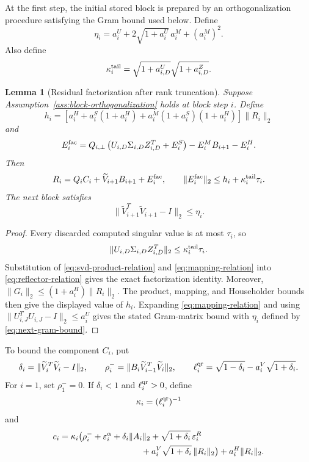 \documentclass[11pt]{article}
\newtheorem{lemma}{Lemma}
\theoremstyle{definition}
\newcommand{\eps}{\varepsilon}
\begin{document}
At the first step, the initial stored block is prepared by an
orthogonalization procedure satisfying the Gram bound used below.
Define
\begin{equation}
 \eta_i=a_i^U+2\sqrt{1+a_i^U}\,a_i^M+(a_i^M)^2.
 \label{eq:next-gram-bound}
\end{equation}
Also define
\begin{equation}
 \kappa_i^{\rm tail}
   =\sqrt{1+a_{i,D}^U}\sqrt{1+a_{i,D}^Z}.
 \label{eq:tail-factor}
\end{equation}

\begin{lemma}[Residual factorization after rank truncation]
\label{lem:thresholded-factorization}
Suppose Assumption~\ref{ass:block-orthogonalization} holds at block step $i$.
Define
\[
 h_i=\left[a_i^H+a_i^S(1+a_i^H)
       +a_i^M(1+a_i^S)(1+a_i^H)\right]\|R_i\|_2
\]
and
\begin{equation}
 E_i^{\rm fac}=Q_{i,\perp}
  \left(U_{i,D}\Sigma_{i,D}Z_{i,D}^T+E_i^S\right)
  -E_i^M B_{i+1}-E_i^H.
 \label{eq:factorization-error-definition}
\end{equation}
Then
\begin{equation}
 R_i=Q_iC_i+\widetilde V_{i+1}B_{i+1}+E_i^{\rm fac},
 \qquad
 \|E_i^{\rm fac}\|_2
 \le h_i+\kappa_i^{\rm tail}\tau_i.
 \label{eq:factorization-residual}
\end{equation}
The next block satisfies
\[
 \|\widetilde V_{i+1}^T\widetilde V_{i+1}-I\|_2\le\eta_i.
\]
\end{lemma}

\begin{proof}
Every discarded computed singular value is at most $\tau_i$, so
\[
 \|U_{i,D}\Sigma_{i,D}Z_{i,D}^T\|_2
 \le\kappa_i^{\rm tail}\tau_i.
\]
Substitution of \eqref{eq:svd-product-relation} and
\eqref{eq:mapping-relation} into \eqref{eq:reflector-relation} gives the exact
factorization identity.  Moreover,
$\|G_i\|_2\le(1+a_i^H)\|R_i\|_2$.  The product, mapping, and Householder bounds
then give the displayed value of $h_i$.
Expanding \eqref{eq:mapping-relation} and using
$\|U_{i,J}^TU_{i,J}-I\|_2\le a_i^U$ gives
the stated Gram-matrix bound with $\eta_i$ defined by
\eqref{eq:next-gram-bound}.
\end{proof}

To bound the component $C_i$, put
\[
 \delta_i=\|\widetilde V_i^T\widetilde V_i-I\|_2,
 \qquad
 \rho_i^-=
 \|B_i\widetilde V_{i-1}^T\widetilde V_i\|_2,
 \qquad
 \ell_i^{\rm qr}=\sqrt{1-\delta_i}
                  -a_i^V\sqrt{1+\delta_i}.
\]
For $i=1$, set $\rho_1^-=0$.  If $\delta_i<1$ and
$\ell_i^{\rm qr}>0$, define
\[
 \kappa_i=(\ell_i^{\rm qr})^{-1}
\]
and
\begin{equation}
\begin{split}
 c_i={}&\kappa_i\bigl(
 \rho_i^-+\eps_i^\alpha+\delta_i\|A_i\|_2
 +\sqrt{1+\delta_i}\,\eps_i^R\\
 &\hspace{29mm}
 +a_i^V\sqrt{1+\delta_i}\,\|R_i\|_2\bigr)
 +a_i^H\|R_i\|_2.
\end{split}
\label{eq:ci-definition}
\end{equation}
\end{document}
